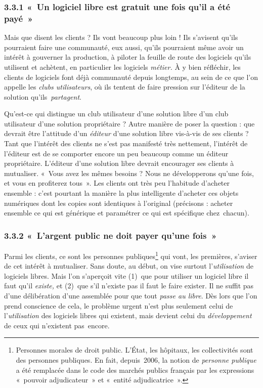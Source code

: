\documentclass{FramateX}
\begin{document}
\begin{refsection}
\subsubsection*{3.3.1 «~Un logiciel libre est gratuit une fois qu'il a été payé~»}
{}


Mais que disent les clients ? Ils vont beaucoup plus loin ! Ils
s'avisent qu'ils pourraient faire une communauté, eux aussi, qu'ils
pourraient même avoir un intérêt à gouverner la production, à piloter
la feuille de route des logiciels qu'ils utilisent et achètent, en
particulier les logiciels \textit{métier.} À y bien réfléchir, les
clients de logiciels font déjà communauté depuis longtemps, au sein de
ce que l'on appelle les \textit{clubs utilisateurs}, où ils tentent de
faire pression sur l'éditeur de la solution qu'ils~\textit{partagent}. 

Qu'est-ce qui distingue un club utilisateur d'une solution libre d'un
club utilisateur d'une solution propriétaire ? Autre manière de poser
la question : que devrait être l'attitude d'un \textit{éditeur} d'une
solution libre vis-à-vis de ses clients ? Tant que l'intérêt des
clients ne s'est pas manifesté très nettement, l'intérêt de l'éditeur
est de se comporter encore un peu beaucoup comme un éditeur
propriétaire. L'éditeur d'une solution libre devrait encourager ses
clients à mutualiser. «~Vous avez les mêmes besoins ? Nous ne
développerons qu'une fois, et vous en profiterez tous~». Les clients
ont très peu l'habitude d'acheter ensemble : c'est pourtant la manière
la plus intelligente d'acheter ces objets numériques dont les copies
sont identiques à l'original (précisons : acheter ensemble ce qui est
générique et paramétrer ce qui est spécifique chez~chacun).

\subsubsection*{3.3.2 «~L'argent public ne doit payer qu'une fois~»}
{}

Parmi les clients, ce sont les personnes publiques\footnote{Personnes
morales de droit public. L'État, les hôpitaux, les collectivités sont
des personnes publiques. En fait, depuis~2006, la notion de
\textit{personne publique} a été remplacée dans le code des marchés
publics français par les expressions
«~pouvoir adjudicateur~» et «~entité adjudicatrice~».} qui vont, les premières, s'aviser de cet intérêt à
mutualiser. Sans doute, au début, on vise surtout
l'\textit{utilisation} de logiciels libres. Mais l'on s'aperçoit vite
(1)~que pour utiliser un logiciel libre il faut qu'il \textit{existe,
}et (2)~que s'il n'existe pas il faut le faire exister. Il ne suffit
pas d'une délibération d'une assemblée pour que tout \textit{passe au
libre}. Dès lors que l'on prend conscience de cela, le problème urgent
n'est plus seulement celui de l'\textit{utilisation} des logiciels
libres qui existent, mais devient celui du \textit{développement }de
ceux qui n'existent pas~encore.


\end{refsection}
\end{document}
